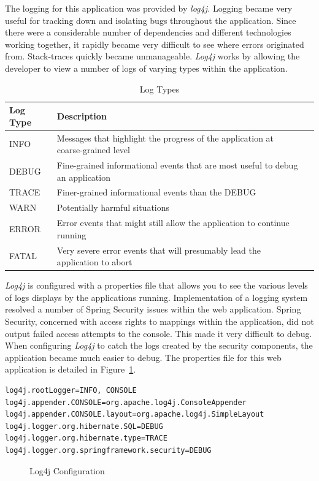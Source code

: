 The logging for this application was provided by \textit{log4j.} Logging became very useful for tracking down and isolating bugs throughout the application. Since there were a considerable number of dependencies and different technologies working together, it rapidly became very difficult to see where errors originated from. Stack-traces quickly became unmanageable. \textit{Log4j} works by allowing the developer to view a number of logs of varying types within the application.
\begin{table}[H]
\caption{Log Types}
\begin{center}
    \begin{tabular}{ | l | l | p{5cm} |}
    \hline
    Log Type & Description \\ \hline
    INFO & Messages that highlight the progress of the application at coarse-grained level  \\ \hline
    DEBUG & Fine-grained informational events that are most useful to debug an application\\ \hline
	TRACE & Finer-grained informational events than the DEBUG\\ \hline
	WARN & Potentially harmful situations\\ \hline
	ERROR & Error events that might still allow the application to continue running\\ \hline
    FATAL & Very severe error events that will presumably lead the application to abort\\ \hline
    \end{tabular}
\end{center}

\end{table}

\textit{Log4j} is configured with a properties file that allows you to see the various levels of logs displays by the applications running. Implementation of a logging system resolved a number of Spring Security issues within the web application. Spring Security, concerned with access rights to mappings within the application, did not output failed access attempts to the console. This made it very difficult to debug. When configuring \textit{Log4j} to catch the logs created by the security components, the application became much easier to debug. The properties file for this web application is detailed in Figure~\ref{fig:log4jc}.


\begin{lstlisting}
log4j.rootLogger=INFO, CONSOLE
log4j.appender.CONSOLE=org.apache.log4j.ConsoleAppender
log4j.appender.CONSOLE.layout=org.apache.log4j.SimpleLayout
log4j.logger.org.hibernate.SQL=DEBUG
log4j.logger.org.hibernate.type=TRACE
log4j.logger.org.springframework.security=DEBUG
\end{lstlisting}
\begin{figure}[H]
\caption{Log4j Configuration}
\label{fig:log4jc}
\end{figure}

